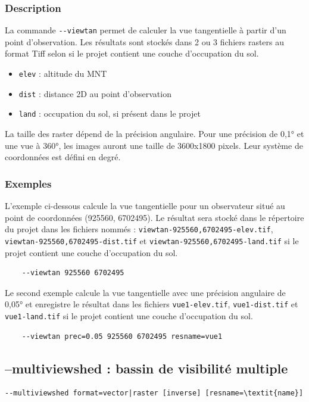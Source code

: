 \documentclass{report}
\begin{document}
\subsubsection{Description}
La commande \verb|--viewtan| permet de calculer la vue tangentielle à partir d'un point d'observation. Les résultats sont stockés dans 2 ou 3 fichiers rasters au format Tiff selon si le projet contient une couche d'occupation du sol. 
\begin{itemize}
	\item \verb|elev| : altitude du MNT
	\item \verb|dist| : distance 2D au point d'observation
	\item \verb|land| : occupation du sol, si présent dans le projet
\end{itemize}

La taille des raster dépend de la précision angulaire. Pour une précision de 0,1° et une vue à 360°, les images auront une taille de 3600x1800 pixels. Leur système de coordonnées est défini en degré. 

\subsubsection{Exemples}
L'exemple ci-dessous calcule la vue tangentielle pour un observateur situé au point de coordonnées (925560, 6702495). Le résultat sera stocké dans le répertoire du projet dans les fichiers nommés : \verb|viewtan-925560,6702495-elev.tif|, \verb|viewtan-925560,6702495-dist.tif| et \verb|viewtan-925560,6702495-land.tif| si le projet contient une couche d'occupation du sol.
\begin{Verbatim}
	--viewtan 925560 6702495
\end{Verbatim}

Le second exemple calcule la vue tangentielle avec une précision angulaire de 0,05° et enregistre le résultat dans les fichiers \verb|vue1-elev.tif|, \verb|vue1-dist.tif| et \verb|vue1-land.tif| si le projet contient une couche d'occupation du sol.
\begin{Verbatim}
	--viewtan prec=0.05 925560 6702495 resname=vue1
\end{Verbatim}


\subsection{--multiviewshed : bassin de visibilité multiple}
\begin{Verbatim}[commandchars=\\\{\}]
--multiviewshed format=vector|raster [inverse] [resname=\textit{name}]
\end{Verbatim}
\end{document}
